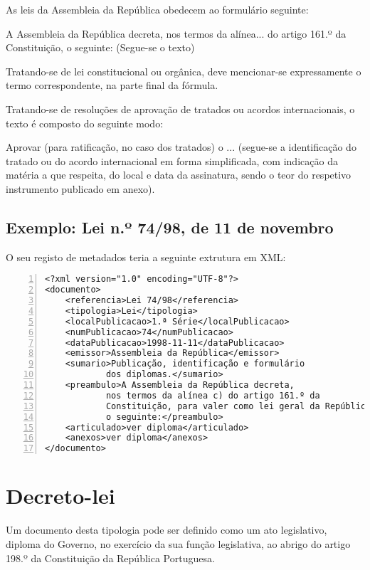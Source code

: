 As leis da Assembleia da República obedecem ao formulário seguinte:
\begin{quoting}
A Assembleia da República decreta, nos termos da alínea... do artigo 161.º da Constituição, o seguinte:
(Segue-se o texto)
\end{quoting}

Tratando-se de lei constitucional ou orgânica, deve mencionar-se expressamente o termo correspondente, 
na parte final da fórmula. 

Tratando-se de resoluções de aprovação de tratados ou acordos internacionais, o texto é composto do seguinte modo:
\begin{quoting}
Aprovar (para ratificação, no caso dos tratados) o ... 
(segue-se a identificação do tratado ou do acordo internacional em forma simplificada, 
com indicação da matéria a que respeita, do local e data da assinatura, sendo o teor do respetivo 
instrumento publicado em anexo).
\end{quoting}

\subsection{Exemplo: Lei n.º 74/98, de 11 de novembro} 

O seu registo de metadados teria a seguinte extrutura em XML:

\begin{Verbatim}[frame=single, numbers=left, fontsize=\small, commandchars=\\\{\}]
<?xml version="1.0" encoding="UTF-8"?>
<documento>
    <referencia>Lei 74/98</referencia>
    <tipologia>Lei</tipologia>
    <localPublicacao>1.ª Série</localPublicacao>
    <numPublicacao>74</numPublicacao>
    <dataPublicacao>1998-11-11</dataPublicacao>
    <emissor>Assembleia da República</emissor>
    <sumario>Publicação, identificação e formulário 
            dos diplomas.</sumario>
    <preambulo>A Assembleia da República decreta, 
            nos termos da alínea c) do artigo 161.º da 
            Constituição, para valer como lei geral da República, 
            o seguinte:</preambulo>
    <articulado>ver diploma</articulado>
    <anexos>ver diploma</anexos>
</documento>
\end{Verbatim}


\section{Decreto-lei}

Um documento desta tipologia pode ser definido como um ato legislativo, diploma do Governo, no exercício 
da sua função legislativa, ao abrigo do artigo 198.º da Constituição da República Portuguesa.

